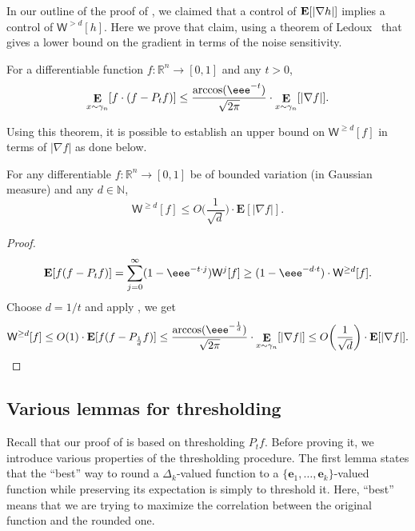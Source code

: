 \documentclass{toc}
\newcommand{\E}{{\bf E}}
\begin{document}
In our outline of the proof of , we claimed that a control of
$\E[|\nabla h|]$ implies a control of $\mathsf{W}^{> d}[h]$. Here we prove that
claim, using a theorem of Ledoux~\cite{Ledoux:94} that gives a lower bound on
the gradient in terms of the noise sensitivity. 

%
\begin{theorem}[Ledoux]  %
  \label{thm:Ledoux}
    For a differentiable function $f: \mathbb{R}^n \rightarrow [0,1]$ and any $t > 0$,
\[
\mathop{\mathbf{E}}_{x \sim \gamma_n} [f \cdot (f - P_t f)]  \le \frac{\arccos (\eee^{-t})}{\sqrt{2\pi}} \cdot \mathop{\mathbf{E}}_{x \sim \gamma_n}[|\nabla f|]. 
\]
\end{theorem}
Using this theorem, it is possible to establish an upper bound on $\mathsf{W}^{\ge d}[f]$ in terms of $|\nabla f|$ as done below. 
\begin{corollary}\label{corr:gradient}
    For any differentiable $f: \mathbb{R}^n \rightarrow [0,1]$ be of bounded variation (in Gaussian measure) and any $d \in \mathbb{N}$,
\[
\mathsf{W}^{\ge d} [f]  \leq O\bigg( \frac{1}{\sqrt{d}}\bigg) \cdot \mathbf{E}[|\nabla f|].
\]
\end{corollary}
\begin{proof}
\begin{eqnarray*}
\mathbf{E}[ f (f- P_t f)] = \sum_{j=0}^{\infty} (1- \eee^{-t \cdot j}) \mathsf{W}^{j}[f] \ge (1-\eee^{-d \cdot t}) \cdot  \mathsf{W}^{ \ge d}[f].
\end{eqnarray*}
Choose $d=1/t$ and apply , we get 
\[
\mathsf{W}^{ \ge d}[f] \leq O(1) \cdot \mathbf{E}[ f (f- P_{\frac{1}{d}} f)] \le  \frac{\arccos (\eee^{-\frac1d})}{\sqrt{2\pi}} \cdot \mathop{\mathbf{E}}_{x \sim \gamma_n}[|\nabla f|] \le O\bigg( \frac{1}{\sqrt{d}}\bigg) \cdot \mathbf{E}[|\nabla f|].\qedhere
\]
\end{proof}

\subsection{Various lemmas for thresholding}

Recall that our proof of  is based on thresholding $P_t f$. Before proving it, we
introduce various properties of the thresholding procedure.
The first lemma states that the ``best'' way to round a $\Delta_k$-valued function to
a $\{\mathbf{e}_1, \dots, \mathbf{e}_k\}$-valued function while preserving its expectation is simply to threshold it.
Here, ``best'' means that we are trying to maximize the correlation between the original function
and the rounded one.
\end{document}
